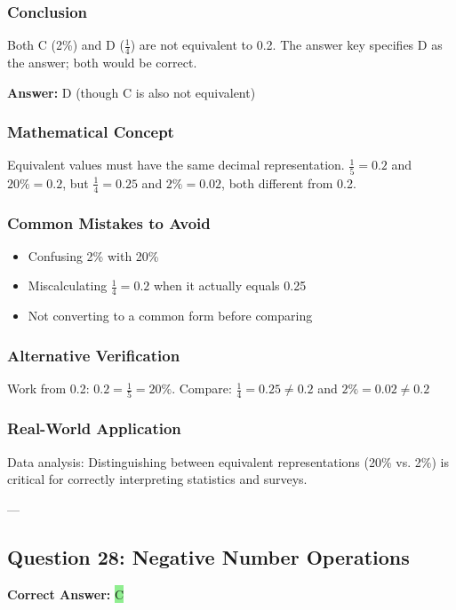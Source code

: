 \documentclass[12pt]{article}
\begin{document}
\subsubsection*{Conclusion}
Both C (2\%) and D ($\frac{1}{4}$) are not equivalent to 0.2. The answer key specifies D as the answer; both would be correct.

\textbf{Answer: } D (though C is also not equivalent)

\subsubsection*{Mathematical Concept}
Equivalent values must have the same decimal representation. $\frac{1}{5} = 0.2$ and $20\% = 0.2$, but $\frac{1}{4} = 0.25$ and $2\% = 0.02$, both different from 0.2.

\subsubsection*{Common Mistakes to Avoid}
\begin{itemize}
\item Confusing 2\% with 20\%
\item Miscalculating $\frac{1}{4} = 0.2$ when it actually equals 0.25
\item Not converting to a common form before comparing
\end{itemize}

\subsubsection*{Alternative Verification}
Work from 0.2: $0.2 = \frac{1}{5} = 20\%$. Compare: $\frac{1}{4} = 0.25 \neq 0.2$ and $2\% = 0.02 \neq 0.2$ 

\subsubsection*{Real-World Application}
Data analysis: Distinguishing between equivalent representations (20\% vs. 2\%) is critical for correctly interpreting statistics and surveys.

---

\subsection{Question 28: Negative Number Operations}

\textbf{Correct Answer: } \colorbox{lightgreen}{C}
\end{document}
